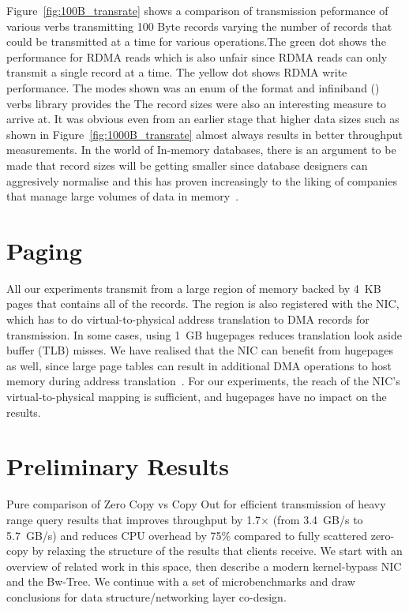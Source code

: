 Figure~\ref{fig:100B_transrate} shows a comparison of transmission
peformance of various verbs transmitting 100 Byte records varying the number of records
that could be transmitted at a time for various operations.The green dot shows
the performance for RDMA reads which is also unfair
since RDMA reads can only transmit a single record at a time. The yellow dot
shows RDMA write performance. The modes shown was an enum of the format 
 and infiniband 
() verbs library provides the  The record sizes were 
also an interesting measure to arrive at. It was obvious even from an earlier stage
that higher data sizes such as shown in Figure~\ref{fig:1000B_transrate} almost 
always results in better throughput measurements. In the world of In-memory databases,
there is an argument to be made that record sizes will be getting smaller since 
database designers can aggresively normalise and this has proven increasingly to
the liking of companies that manage large volumes of data in memory~\cite{fb-memcache,fb-workload}.


\section{Paging}
All our experiments transmit from a large region of memory backed by 4~KB pages
that contains all of the records. The region is also
registered with the NIC, which has to do virtual-to-physical address
translation to DMA records for transmission.
In some cases, using 1~GB hugepages reduces translation look aside buffer
(TLB) misses. We have realised that the NIC can benefit from
hugepages as well, since large page tables can result in additional
DMA operations to host memory during address translation~\cite{farm,rdma}. For
our experiments, the reach of the NIC's virtual-to-physical mapping is
sufficient, and hugepages have no impact on the results.


\section{Preliminary Results}
Pure comparison of Zero Copy vs Copy Out for efficient transmission of heavy range query
results that improves throughput by 1.7$\times$ (from 3.4~GB/s to 5.7~GB/s) and
reduces CPU overhead by 75\% compared to fully scattered zero-copy by relaxing
the structure of the results that clients receive.  We start with an
overview of related work in this space, then describe a modern kernel-bypass NIC
and the Bw-Tree. We continue with a set of microbenchmarks and draw
conclusions for data structure/networking layer co-design.

